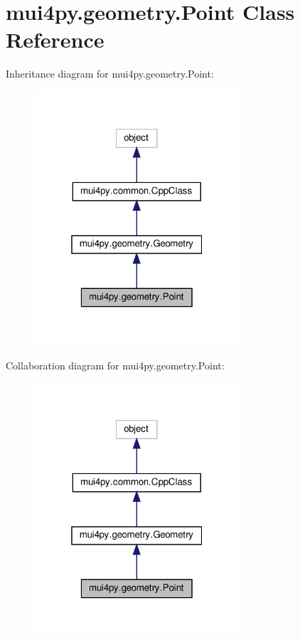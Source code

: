 \hypertarget{classmui4py_1_1geometry_1_1_point}{}\section{mui4py.\+geometry.\+Point Class Reference}
\label{classmui4py_1_1geometry_1_1_point}


Inheritance diagram for mui4py.\+geometry.\+Point\+:
\nopagebreak
\begin{figure}[H]
\begin{center}
\leavevmode
\includegraphics[width=217pt]{classmui4py_1_1geometry_1_1_point__inherit__graph}
\end{center}
\end{figure}


Collaboration diagram for mui4py.\+geometry.\+Point\+:
\nopagebreak
\begin{figure}[H]
\begin{center}
\leavevmode
\includegraphics[width=217pt]{classmui4py_1_1geometry_1_1_point__coll__graph}
\end{center}
\end{figure}
